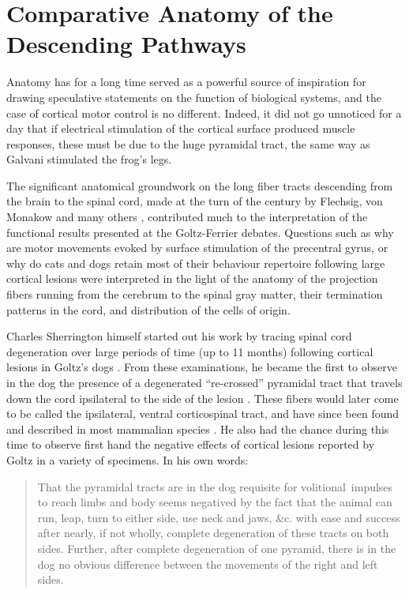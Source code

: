 \section{Comparative Anatomy of the Descending Pathways}

Anatomy has for a long time served as a powerful source of inspiration for drawing speculative statements on the function of biological systems, and the case of cortical motor control is no different. Indeed, it did not go unnoticed for a day that if electrical stimulation of the cortical surface produced muscle responses, these must be due to the huge pyramidal tract, the same way as Galvani stimulated the frog's legs.

The significant anatomical groundwork on the long fiber tracts descending from the brain to the spinal cord, made at the turn of the century by Flechsig, von Monakow and many others \cite{Nathan1955}, contributed much to the interpretation of the functional results presented at the Goltz-Ferrier debates. Questions such as why are motor movements evoked by surface stimulation of the precentral gyrus, or why do cats and dogs retain most of their behaviour repertoire following large cortical lesions were interpreted in the light of the anatomy of the projection fibers running from the cerebrum to the spinal gray matter, their termination patterns in the cord, and distribution of the cells of origin.

Charles Sherrington himself started out his work by tracing spinal cord degeneration over large periods of time (up to 11 months) following cortical lesions in Goltz's dogs \cite{Langley1884,Sherrington1885}. From these examinations, he became the first to observe in the dog the presence of a degenerated ``re-crossed'' pyramidal tract that travels down the cord ipsilateral to the side of the lesion \cite{Sherrington1885}. These fibers would later come to be called the ipsilateral, ventral corticospinal tract, and have since been found and described in most mammalian species \cite{Kuypers1981,Brosamle2000,Lacroix2004}. He also had the chance during this time to observe first hand the negative effects of cortical lesions reported by Goltz in a variety of specimens. In his own words:

\blockquote[{\protect\cite[p.189]{Sherrington1885}}]{That the pyramidal tracts are in the dog requisite for volitional~impulses to reach limbs and body seems negatived by the fact that the animal can run, leap, turn to either side, use neck and jaws, \&c. with ease and success after nearly, if not wholly, complete degeneration of these tracts on both sides. Further, after complete degeneration of one pyramid, there is in the dog no obvious difference between the movements of the right and left sides.}

